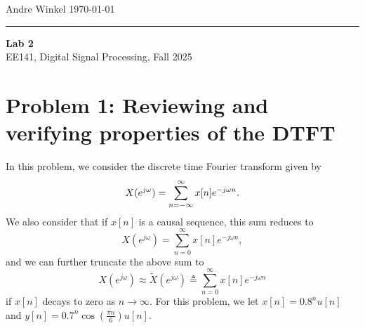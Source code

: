 \documentclass[11pt]{article}
\begin{document}
\noindent Andre Winkel \hfill \today \\
\rule{\textwidth}{0.4pt}

\begin{center} \large {\textbf{Lab 2}} \\[0em] {EE141, Digital Signal Processing, Fall 2025} \end{center}

\section{Problem 1: Reviewing and verifying properties of the DTFT}
In this problem, we consider the discrete time Fourier transform given by
\begin{equation} \notag
    X(e^{j\omega}) = \sum_{n=-\infty}^{\infty}x[n]e^{-j\omega n}.
\end{equation}
We also consider that if $x[n]$ is a causal sequence, this sum reduces to
\begin{equation}
    X(e^{j\omega}) = \sum_{n=0}^{\infty}x[n]e^{-j\omega n},
\end{equation}
and we can further truncate the above sum to
\begin{equation}
    X(e^{j\omega}) \approx \tilde X(e^{j\omega}) \triangleq \sum_{n=0}^{\infty}x[n]e^{-j\omega n}
\end{equation}
if $x[n]$ decays to zero as $n \to \infty$.
For this problem, we let $x[n]=0.8^nu[n]$ and $y[n]=0.7^n\cos(\frac{\pi n}{6})u[n]$.
\end{document}

